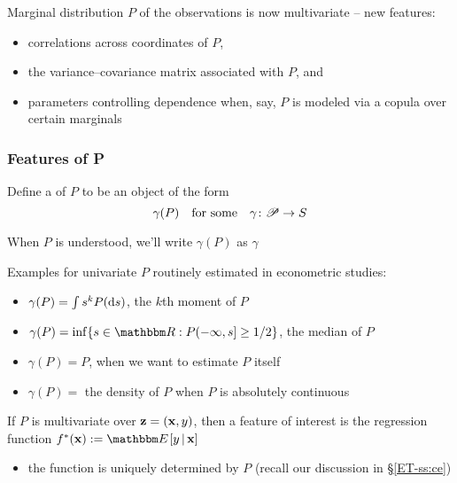 \begin{frame}
    
    \vspace{2em}
    Marginal distribution $P$ of the observations is now
    multivariate -- new features:
    \begin{itemize}
        \item correlations across coordinates of $P$,
        \item the variance--covariance matrix associated with $P$, and
        \item parameters controlling dependence when, say, $P$ is modeled via a copula over certain marginals
    \end{itemize}
    
\end{frame}

\begin{frame}\frametitle{Features of P}
    
    \vspace{2em}
    Define a  of $P$ to be an
    object of the form
    \begin{equation*}
        \label{eq:dfeature}
        \gamma(P)
        \quad \text{for some} \quad
        \gamma \colon \mathscr P \to S
    \end{equation*}
    
    \vspace{1em}
    When $P$ is understood, we'll write $\gamma(P)$ as $\gamma$
    
\end{frame}

\begin{frame}
    
    \vspace{2em}
    Examples for univariate $P$
    routinely estimated in econometric studies:  
    
    \begin{itemize}
        \item $\gamma(P) = \int s^k P(\mathop{}\!\mathrm{d} s)$, the $k$th moment of $P$
        \item $\gamma(P) = \inf\setntn{s \in \RR}{P(- \infty, s] \geq 1/2}$, the
            median of $P$
        \item $\gamma(P) = P$, when we want to estimate $P$ itself
        \item $\gamma(P) = $ the density of $P$ when $P$ is absolutely continuous
    \end{itemize}
      
    \vspace{.7em}
    If $P$ is multivariate over ${\mathbf z} = ({\mathbf x}, y)$, then a feature of interest is the regression function
    $f^*(\boldx) := \EE[ y \given \boldx]$
    \begin{itemize}
        \item the function is uniquely determined by $P$ (recall our discussion in \S\ref{ET-ss:ce})
    \end{itemize}
    
\end{frame}

